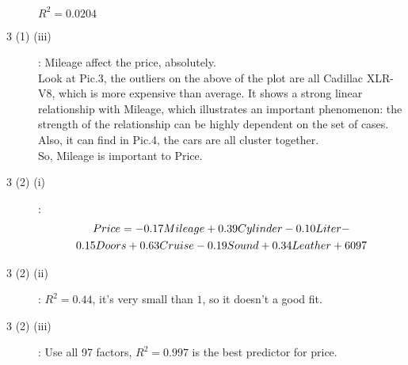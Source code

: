 \documentclass[UTF8]{ctexart}
\begin{document}
\begin{description}
$R^2 = 0.0204$
\item[3 (1) (iii)]: 
Mileage affect the price, absolutely.\\
Look at Pic.3, the outliers on the above of the plot are all Cadillac XLR-V8, which is more expensive than average. It shows a strong linear relationship with Mileage, which illustrates an important phenomenon: the strength of the relationship can be highly dependent on the set of cases. Also, it can find in Pic.4, the cars are all cluster together.\\
So, Mileage is important to Price.\\
\item[3 (2) (i)]:
\begin{multline}
$$Price = -0.17Mileage +0.39Cylinder -0.10Liter-\\0.15Doors + 0.63Cruise -0.19Sound +0.34Leather + 6097$$
\end{multline}
\item[3 (2) (ii)]:
$R^2 = 0.44$, it's very small than $1$, so it doesn't a good fit.
\item[3 (2) (iii)]:
Use all 97 factors, $R^2=0.997$ is the best predictor for price. 
\end{description}
\end{document}
